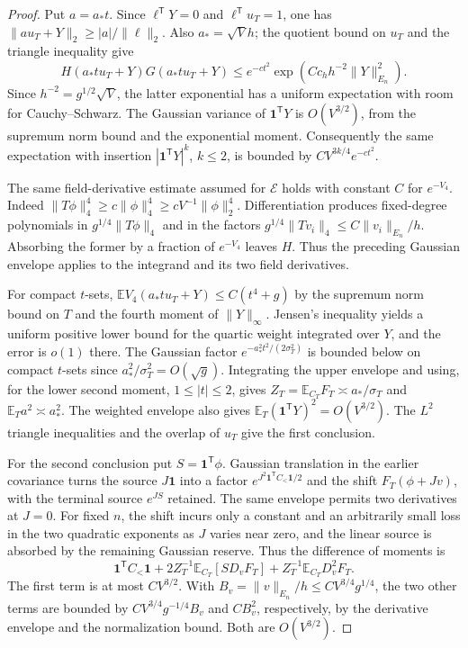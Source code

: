 \documentclass[11pt]{article}
\theoremstyle{definition}
\newcommand{\one}{\mathbf 1}
\newcommand{\E}{\mathbb E}
\begin{document}
\begin{proof}
Put \(a=a_*t\). Since \(\ell^{\mathsf T}Y=0\) and
\(\ell^{\mathsf T}u_T=1\), one has
\(\|a u_T+Y\|_2\ge |a|/\|\ell\|_2\).
Also \(a_*=\sqrt V h\); the quotient bound on \(u_T\)
and the triangle inequality give
\begin{equation}
 H(a_*t u_T+Y)G(a_*t u_T+Y)
 \le e^{-c t^2}\exp(C c_h h^{-2}\|Y\|_{E_n}^2).
\end{equation}
Since \(h^{-2}=g^{1/2}\sqrt V\), the latter exponential has a
uniform expectation with room for Cauchy--Schwarz. The Gaussian
variance of \(\one^{\mathsf T}Y\) is \(O(V^{3/2})\), from the
supremum norm bound and the exponential moment. Consequently the
same expectation with insertion \(|\one^{\mathsf T}Y|^k\),
\(k\le2\), is bounded by \(C V^{3k/4} e^{-ct^2}\).

The same field-derivative estimate assumed for \(\mathcal E\) holds
with constant \(C\) for \(e^{-V_4}\). Indeed
\(\|T\phi\|_4^4\ge c\|\phi\|_4^4\ge
cV^{-1}\|\phi\|_2^4\). Differentiation produces fixed-degree
polynomials in \(g^{1/4}\|T\phi\|_4\) and in the factors
\(g^{1/4}\|Tv_i\|_4\le C\|v_i\|_{E_n}/h\).
Absorbing the former by a fraction of \(e^{-V_4}\) leaves \(H\).
Thus the preceding Gaussian envelope applies to the integrand
and its two field derivatives.

For compact \(t\)-sets,
\(\E V_4(a_*t u_T+Y)\le C(t^4+g)\) by the supremum norm
bound on \(T\) and the fourth moment of \(\|Y\|_\infty\).
Jensen's inequality yields a uniform positive lower bound for the
quartic weight integrated over \(Y\), and the error is \(o(1)\) there.
The Gaussian factor \(e^{-a_*^2t^2/(2\sigma_T^2)}\) is bounded
below on compact \(t\)-sets since
\(a_*^2/\sigma_T^2=O(\sqrt g)\). Integrating the upper envelope
and using, for the lower second moment, \(1\le |t|\le2\),
gives \(Z_T=\E_{C_T}F_T\asymp a_*/\sigma_T\) and
\(\E_T a^2\asymp a_*^2\).
The weighted envelope also gives
\(\E_T(\one^{\mathsf T}Y)^2=O(V^{3/2})\).
The \(L^2\) triangle inequalities and the overlap of \(u_T\)
give the first conclusion.

For the second conclusion put \(S=\one^{\mathsf T}\phi\).
Gaussian translation in the earlier covariance turns the source
\(J\one\) into a factor \(e^{J^2\one^{\mathsf T}C_<\one/2}\)
and the shift \(F_T(\phi+Jv)\), with the terminal source
\(e^{JS}\) retained. The same envelope permits two derivatives
at \(J=0\). For fixed \(n\), the shift incurs only a constant
and an arbitrarily small loss in the two quadratic exponents
as \(J\) varies near zero, and the linear source is absorbed
by the remaining Gaussian reserve. Thus the difference of moments is
\begin{equation}
 \one^{\mathsf T}C_<\one+
   2 Z_T^{-1}\E_{C_T}[S D_v F_T]+
     Z_T^{-1}\E_{C_T} D_v^2 F_T .
\end{equation}
The first term is at most \(CV^{3/2}\). With
\(B_v=\|v\|_{E_n}/h\le C V^{3/4}g^{1/4}\),
the two other terms are bounded by
\(C V^{3/4}g^{-1/4}B_v\) and \(C B_v^2\), respectively, by
the derivative envelope and the normalization bound. Both are
\(O(V^{3/2})\).
\end{proof}
\end{document}
